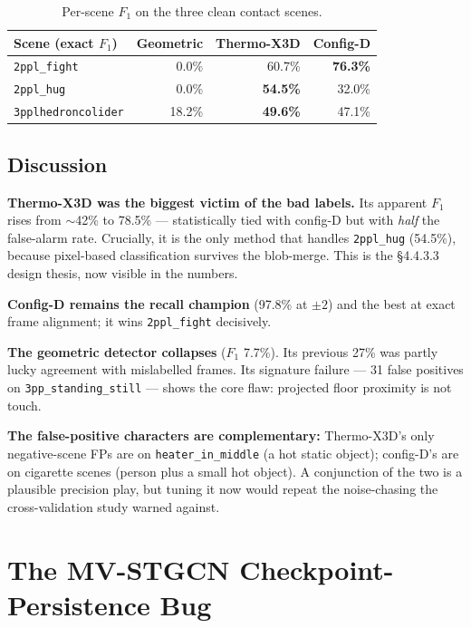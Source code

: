 \documentclass[11pt, a4paper]{article}
\begin{document}
\begin{table}[H]
\centering
\small
\begin{tabular}{lrrr}
\toprule
Scene (exact $F_1$) & Geometric & Thermo-X3D & Config-D \\
\midrule
\texttt{2ppl\_fight}        &  0.0\% & 60.7\% & \textbf{76.3\%} \\
\texttt{2ppl\_hug}          &  0.0\% & \textbf{54.5\%} & 32.0\% \\
\texttt{3pplhedroncolider}  & 18.2\% & \textbf{49.6\%} & 47.1\% \\
\bottomrule
\end{tabular}
\caption{Per-scene $F_1$ on the three clean contact scenes.}
\end{table}

\subsection{Discussion}

\textbf{Thermo-X3D was the biggest victim of the bad labels.} Its apparent $F_1$ rises
from $\sim$42\% to 78.5\% --- statistically tied with config-D but with \emph{half} the
false-alarm rate. Crucially, it is the only method that handles \texttt{2ppl\_hug}
(54.5\%), because pixel-based classification survives the blob-merge. This is the
\S4.4.3.3 design thesis, now visible in the numbers.

\textbf{Config-D remains the recall champion} (97.8\% at $\pm2$) and the best at exact
frame alignment; it wins \texttt{2ppl\_fight} decisively.

\textbf{The geometric detector collapses} ($F_1$ 7.7\%). Its previous 27\% was partly
lucky agreement with mislabelled frames. Its signature failure --- 31 false positives on
\texttt{3pp\_standing\_still} --- shows the core flaw: projected floor proximity is not
touch.

\textbf{The false-positive characters are complementary:} Thermo-X3D's only
negative-scene FPs are on \texttt{heater\_in\_middle} (a hot static object); config-D's
are on cigarette scenes (person plus a small hot object). A conjunction of the two is a
plausible precision play, but tuning it now would repeat the noise-chasing the
cross-validation study warned against.

\section{The MV-STGCN Checkpoint-Persistence Bug}
\label{sec:bug}
\end{document}
